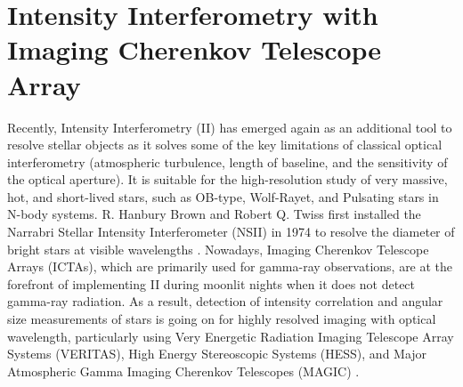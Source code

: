 \section{Intensity Interferometry with Imaging Cherenkov Telescope Array}
Recently, Intensity Interferometry (II) has emerged again as an additional tool to resolve stellar objects as it solves some of the key limitations of classical optical interferometry (atmospheric turbulence, length of baseline, and the sensitivity of the optical aperture). It is suitable for the high-resolution study of very massive, hot, and short-lived stars, such as OB-type, Wolf-Rayet, and Pulsating stars in N-body systems. R. Hanbury Brown and Robert Q. Twiss first installed the Narrabri Stellar Intensity Interferometer (NSII) in 1974 to resolve the diameter of bright stars at visible wavelengths \citep{brown1954lxxiv, brown1974intensity}. Nowadays, Imaging Cherenkov Telescope Arrays (ICTAs), which are primarily used for gamma-ray observations, are at the forefront of implementing II during moonlit nights when it does not detect gamma-ray radiation. As a result, detection of intensity correlation and angular size measurements of stars is going on for highly resolved imaging with optical wavelength, particularly using Very Energetic Radiation Imaging Telescope Array Systems (VERITAS), High Energy Stereoscopic Systems (HESS), and Major Atmospheric Gamma Imaging Cherenkov Telescopes (MAGIC) \citep{kieda2022performance, zmija2022optical, abe2024performance}.

